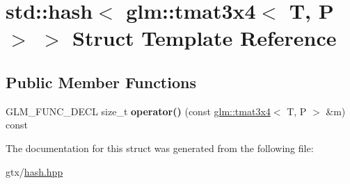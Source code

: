\hypertarget{structstd_1_1hash_3_01glm_1_1tmat3x4_3_01T_00_01P_01_4_01_4}{\section{std\-:\-:hash$<$ glm\-:\-:tmat3x4$<$ T, P $>$ $>$ Struct Template Reference}
\label{structstd_1_1hash_3_01glm_1_1tmat3x4_3_01T_00_01P_01_4_01_4}
}
\subsection*{Public Member Functions}
\begin{DoxyCompactItemize}
\item 
\hypertarget{structstd_1_1hash_3_01glm_1_1tmat3x4_3_01T_00_01P_01_4_01_4_a03b855bd3a00e2a4aba9038c94537ffc}{G\-L\-M\-\_\-\-F\-U\-N\-C\-\_\-\-D\-E\-C\-L size\-\_\-t {\bfseries operator()} (const \hyperlink{structglm_1_1tmat3x4}{glm\-::tmat3x4}$<$ T, P $>$ \&m) const }\label{structstd_1_1hash_3_01glm_1_1tmat3x4_3_01T_00_01P_01_4_01_4_a03b855bd3a00e2a4aba9038c94537ffc}

\end{DoxyCompactItemize}


The documentation for this struct was generated from the following file\-:\begin{DoxyCompactItemize}
\item 
gtx/\hyperlink{hash_8hpp}{hash.\-hpp}\end{DoxyCompactItemize}
